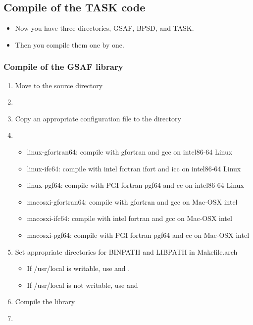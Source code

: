 \documentclass[11pt]{article}
\begin{document}
\subsection{Compile of the TASK code}

\begin{itemize}
\item
Now you have three directories, GSAF, BPSD, and TASK.
\item
Then you compile them one by one.
\end{itemize}

\subsubsection{Compile of the GSAF library}

\begin{enumerate}
\item
Move to the source directory 
\item[\qquad]
\item
Copy an appropriate configuration file to the directory
\item[\qquad]
\begin{itemize}
\item
linux-gfortran64: compile with gfortran and gcc on intel86-64 Linux
\item
linux-ifc64: compile with intel fortran ifort and icc on intel86-64 Linux
\item
linux-pgf64: compile with PGI fortran pgf64 and cc on intel86-64 Linux
\item
macosxi-gfortran64: compile with gfortran and gcc on Mac-OSX intel
\item
macosxi-ifc64: compile with intel fortran and gcc on Mac-OSX intel
\item
macosxi-pgf64: compile with PGI fortran pgf64 and cc on Mac-OSX intel
\end{itemize}
\item
Set appropriate directories for BINPATH and LIBPATH in Makefile.arch
\begin{itemize}
\item
If /usr/local is writable, use  and 
. 
\item
If /usr/local is not writable, use  and 
\end{itemize}
\item
Compile the library
\item[\qquad]

\end{enumerate}
\end{document}
